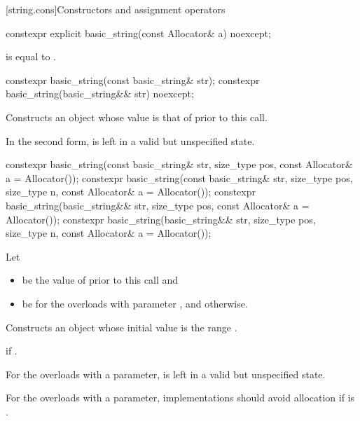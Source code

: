 [string.cons]{Constructors and assignment operators}

%
\begin{itemdecl}
constexpr explicit basic_string(const Allocator& a) noexcept;
\end{itemdecl}

\begin{itemdescr}

\pnum
\ensures
{} is equal to .
\end{itemdescr}

%
\begin{itemdecl}
constexpr basic_string(const basic_string& str);
constexpr basic_string(basic_string&& str) noexcept;
\end{itemdecl}

\begin{itemdescr}
\pnum
\effects
Constructs an object whose
value is that of  prior to this call.

\pnum
\remarks
In the second form,  is left in a valid but unspecified state.
\end{itemdescr}

%
\begin{itemdecl}
constexpr basic_string(const basic_string& str, size_type pos,
                       const Allocator& a = Allocator());
constexpr basic_string(const basic_string& str, size_type pos, size_type n,
                       const Allocator& a = Allocator());
constexpr basic_string(basic_string&& str, size_type pos,
                       const Allocator& a = Allocator());
constexpr basic_string(basic_string&& str, size_type pos, size_type n,
                       const Allocator& a = Allocator());
\end{itemdecl}

\begin{itemdescr}
\pnum
Let
\begin{itemize}
\item
{} be the value of  prior to this call and
\item
{} be 
for the overloads with parameter , and
 otherwise.
\end{itemize}

\pnum
\effects
Constructs an object
whose initial value is the range .

\pnum
\throws
{} if .

\pnum
\remarks
For the overloads with a  parameter,
 is left in a valid but unspecified state.

\pnum
\recommended
For the overloads with a  parameter,
implementations should avoid allocation
if  is .
\end{itemdescr}

